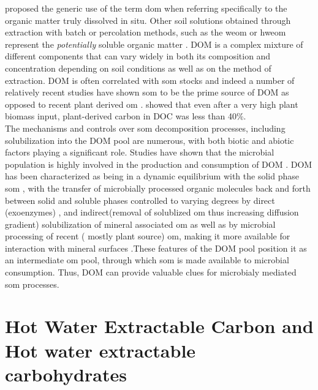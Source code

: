 	\citet{zsolnay2003} proposed the generic use of the term \gls{dom} when referring specifically to the organic matter truly dissolved in situ. Other soil solutions obtained through extraction with batch or percolation methods, such as the \gls{weom} or \gls{hweom} represent the \textit{potentially} soluble organic matter \citep{marschner2003}. DOM is a complex mixture of different components that can vary widely in both its composition and concentration depending on soil conditions  as well as on the method of extraction\citep{bolan2011}. DOM is often  correlated with \gls{som} stocks and indeed a number of relatively recent studies have shown \gls{som} to be the prime source of DOM as opposed to  recent plant derived \gls{om} \citep{malik2013, kaiser2012}. \citet{malik2013}showed that  even after a very high plant biomass input, plant-derived carbon in DOC was less than 40\%.\\
	The mechanisms and controls over \gls{som} decomposition processes, including solubilization  into the DOM pool are numerous, with both biotic and abiotic factors playing a significant role\citep{kalbitz2000, bolan2011}. Studies have shown that the microbial population is highly involved in the production and consumption of DOM \citep{marschnerp2002, malik2013, guggenberger1998}.  DOM has been characterized as being in a dynamic equilibrium with the solid phase \gls{som} \citep{roth2019, kaiser2012},  with the transfer of microbially processed organic molecules back and forth between solid and soluble phases controlled to varying degrees by  direct (exoenzymes) \citep{guggenberger1998},  and indirect(removal of solublized \gls{om} thus increasing diffusion gradient) solubilization of mineral associated \gls{om} as well as by microbial processing of recent ( mostly plant source) \gls{om}, making it more available for interaction with mineral surfaces \citep{kalbitz2003, kalbitz2008}.These features of the DOM pool position it as an intermediate \gls{om} pool, through which \gls{som} is made available to microbial consumption. Thus, DOM can provide valuable clues for microbialy mediated \gls{som} processes. \\

\section{Hot Water Extractable Carbon and Hot water extractable carbohydrates}

